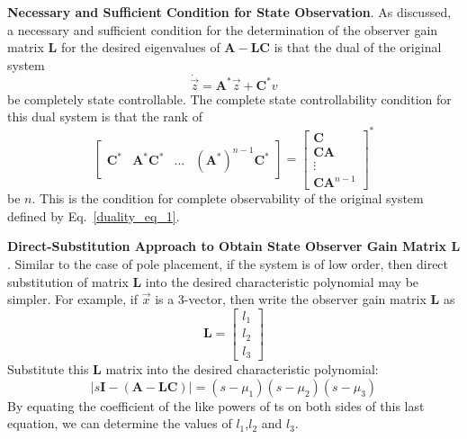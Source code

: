 \documentclass[12pt,a4paper,oneside]{book}
\begin{document}
\begin{onehalfspace}
\vspace{5mm}
\textbf{Necessary and Sufficient Condition for State Observation}. As discussed, a necessary and sufficient condition for the determination of the observer gain matrix $\mathbf{L}$ for the desired eigenvalues of $\mathbf{A-LC}$ is that the dual of the original system
\begin{equation}\label{duality_eq_7}
	\dot{\vec z} = \mathbf{A}^*\vec z + \mathbf{C}^*v
\end{equation}
be completely state controllable. The complete state controllability condition for this dual system is that the rank of 
\begin{equation}\label{duality_eq_8}
	\begin{bmatrix}
		\mathbf{C}^* & \mathbf{A^*C^*} & \dots & (\mathbf{A}^*)^{n-1}\mathbf{C}^*
	\end{bmatrix}= 
	\begin{bmatrix}
		\mathbf{C}  \\
		\mathbf{CA} \\
		\vdots \\
		\mathbf{CA}^{n-1}
	\end{bmatrix}^*
\end{equation}
be $n$. This is the condition for complete observability of the original system 
defined by Eq.~\eqref{duality_eq_1}.

\vspace{5mm}
\textbf{Direct-Substitution Approach to Obtain State Observer Gain Matrix $\mathbf{L}$}. Similar to the case of pole placement, if the system is of low order, then direct substitution of matrix $\mathbf{L}$ into the desired characteristic polynomial may be simpler. For example, if $\vec x$ is a 3-vector, then write the observer gain matrix $\mathbf{L}$ as
\begin{equation} 
\mathbf{L}=\begin{bmatrix}
	l_1\\
	l_2\\
	l_3
\end{bmatrix}
\end{equation}
Substitute this $\mathbf{L}$ matrix into the desired characteristic polynomial:
\begin{equation} 
|s\mathbf{I-(A - LC)}|= (s-\mu_1)(s-\mu_2)(s-\mu_3)
\end{equation}
By equating the coefficient of the like powers of ts on both sides of this last equation, we can determine the values of $l_1$,$l_2$ and $l_3$.


\end{onehalfspace}
\end{document}
